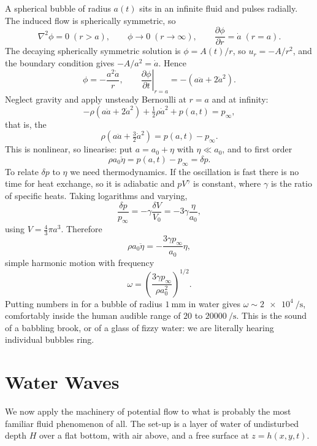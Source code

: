 \documentclass[a4paper]{scrartcl}
\newcommand{\pd}[2]{\frac{\partial #1}{\partial #2}}
\begin{document}
\begin{example}
	A spherical bubble of radius $a(t)$ sits in an infinite fluid and pulses radially. The induced flow is spherically symmetric, so
	$$
	\nabla^2 \phi = 0 \; (r > a), \qquad \phi \to 0 \;(r\to\infty), \qquad \pd{\phi}{r} = \dot a \; (r = a).
	$$
	The decaying spherically symmetric solution is $\phi = A(t)/r$, so $u_r = -A/r^2$, and the boundary condition gives $-A/a^2 = \dot a$. Hence
	$$
	\phi = -\frac{a^2 \dot a}{r}, \qquad \left.\pd{\phi}{t}\right|_{r=a} = -\left(a\ddot a + 2\dot a^2\right).
	$$
	Neglect gravity and apply unsteady Bernoulli at $r = a$ and at infinity:
	$$
	-\rho\left(a \ddot a + 2\dot a^2\right) + \tfrac{1}{2}\rho \dot a^2 + p(a, t) = p_\infty,
	$$
	that is, the 
	$$
	\rho\left(a\ddot a + \tfrac{3}{2}\dot a^2\right) = p(a,t) - p_\infty.
	$$
	This is nonlinear, so linearise: put $a = a_0 + \eta$ with $\eta \ll a_0$, and to first order
	$$
	\rho a_0 \ddot \eta = p(a, t) - p_\infty = \delta p.
	$$
	To relate $\delta p$ to $\eta$ we need thermodynamics. If the oscillation is fast there is no time for heat exchange, so it is adiabatic and $pV^\gamma$ is constant, where $\gamma$ is the ratio of specific heats. Taking logarithms and varying,
	$$
	\frac{\delta p}{p_\infty} = -\gamma\frac{\delta V}{V_0} = -3\gamma\frac{\eta}{a_0},
	$$
	using $V = \tfrac43 \pi a^3$. Therefore
	$$
	\rho a_0 \ddot \eta = -\frac{3\gamma p_\infty}{a_0}\eta,
	$$
	simple harmonic motion with frequency
	$$
	\omega = \left(\frac{3\gamma p_\infty}{\rho a_0^2}\right)^{1/2}.
	$$
	Putting numbers in for a bubble of radius $\SI{1}{\milli\meter}$ in water gives $\omega \sim \SI{2e4}{\per\second}$, comfortably inside the human audible range of $20$ to $\SI{20000}{\per\second}$. This is the sound of a babbling brook, or of a glass of fizzy water: we are literally hearing individual bubbles ring.
\end{example}

\section{Water Waves}

We now apply the machinery of potential flow to what is probably the most familiar fluid phenomenon of all. The set-up is a layer of water of undisturbed depth $H$ over a flat bottom, with air above, and a free surface at $z = h(x, y, t)$.
\end{document}
